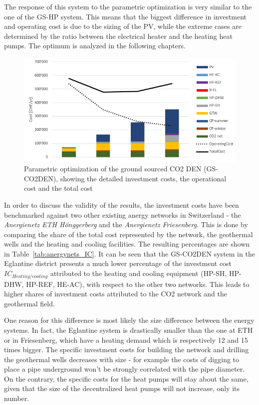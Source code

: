 \documentclass{article}
\begin{document}
The response of this system to the parametric optimization is very similar to the one of the GS-HP system. This means that the biggest difference in investment and operating cost is due to the sizing of the PV, while the extreme cases are determined by the ratio between the electrical heater and the heating heat pumps. The optimum is analyzed in the following chapters.\\

\begin{figure}[htp]
	\centering
	\includegraphics[width=1\textwidth]{V_CO2_G_PO1.png}
	\caption{Parametric optimization of the ground sourced CO2 DEN (GS-CO2DEN), showing the detailed investment costs, the operational cost and the total cost}
	\label{fig:V_CO2_G_PO}
\end{figure}

In order to discuss the validity of the results, the investment costs have been benchmarked against two other existing anergy networks in Switzerland - the \textit{Anergienetz ETH Hönggerberg }and the \textit{Anergienetz Friesenberg}. This is done by comparing the share of the total cost represented by the network, the geothermal wells and the heating and cooling facilities. The resulting percentages are shown in Table~\ref{tab:anergynets_IC}. It can be seen that the GS-CO2DEN system in the Eglantine district presents a much lower percentage of the investment cost  $IC_{Heating/cooling}$ attributed to the heating and cooling equipment (HP-SH, HP-DHW, HP-REF, HE-AC), with respect to the other two networks. This leads to higher shares of investment costs attributed to the CO2 network and the geothermal field.



One reason for this difference is most likely the size difference between the energy systems. In fact, the Eglantine system is drastically smaller than the one at ETH or in Friesenberg, which have a heating demand which is respectively 12 and 15 times bigger. The specific investment costs for building the network and drilling the geothermal wells decreases with size - for example the costs of digging to place a pipe underground won't be strongly correlated with the pipe diameter. On the contrary, the specific costs for the heat pumps will stay about the same, given that the size of the decentralized heat pumps will not increase, only its number.
\end{document}
